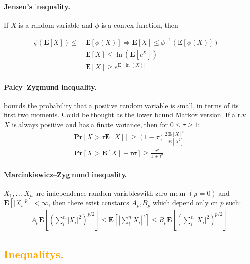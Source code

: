 \documentclass{article}
\newcommand{\prb}[1]{ \mathbf{Pr} \left[ {#1} \right]}
\newcommand{\expp}[1]{ \mathbf{E} \left[ {#1} \right]}
\newcommand{\indpr}{$ X_1, ..., X_n$ are independence random variables}
\begin{document}
\begin{multicols*}{2}
  \paragraph{Jensen's inequality.} If $X$ is a random variable and $\phi$ is a convex function, then:

  \begin{equation*}
    \begin{split}
       \phi\left( \expp{X} \right) \le \ & \expp{\phi\left( X \right)} \Rightarrow   \expp{X} \le \phi^{-1} \left( \expp{\phi\left( X \right)} \right) \\
      & \expp{X} \le \ln\left(\expp{e^{X}}  \right)  \\ 
      &  \expp{X} \ge e^{\expp{\ln \left( X \right)}}  
    \end{split}
  \end{equation*}
  \paragraph{Paley–Zygmund inequality.} bounds the probability that a positive random variable is small, in terms of its first two moments. Could be thought as the lower bound Markov version. If a r.v $X$ is always positive and has a finate variance, then for $0 \le \tau \ge 1$:  
  \begin{equation*}
    \begin{split}
     & \prb{ X > \tau \expp{X} } \ge \left( 1 - \tau \right)^{2}\frac{\expp{X}^{2}}{\expp{X^2}}\\
     &  \prb{ X > \expp{X} - \tau \sigma } \ge \frac{\tau^{2}}{1+\tau^{2}} 
    \end{split}
  \end{equation*}
  \paragraph{Marcinkiewicz–Zygmund inequality.} \indpr with zero mean $\left( \mu = 0  \right)$ and $\expp{|X_{i}|^{p}} < \infty$, then there exist constants $A_{p}, B_{p}$ which depend only on $p$ such:  
  \begin{equation*}
    \begin{split}
      & A_{p}\expp{\left( \sum_{i}^{n}{|X_{i}|^{2}} \right)^{p/2}  } \le \expp{|\sum_{i}^{n}{X_{i}}|^{p} }\le B_{p}\expp{\left( \sum_{i}^{n}{|X_{i}|^{2}} \right)^{p/2}  }        
    \end{split}
  \end{equation*}

  \subsection*{{\textcolor{orange}{Inequalitys.}} } 

\end{multicols*}
\end{document}
